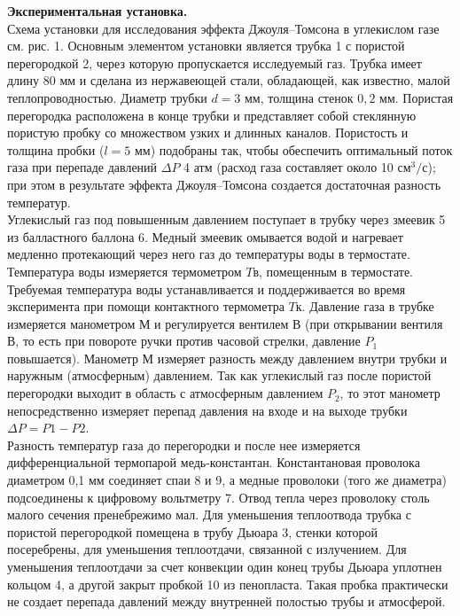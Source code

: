 \documentclass[a4paper, 12pt]{article}%
\begin{document}
	
	
	\textbf{Экспериментальная установка.}\\
	
	
	Схема установки для исследования эффекта Джоуля–Томсона в углекислом газе см. рис. 1. Основным элементом установки является трубка 1 с пористой перегородкой 2, через которую пропускается исследуемый газ. Трубка имеет длину 80 мм и сделана из нержавеющей стали, обладающей, как известно, малой теплопроводностью. Диаметр трубки $d = 3$ мм, толщина стенок $0,2$ мм. Пористая перегородка расположена в конце трубки и представляет собой стеклянную пористую пробку со множеством узких и длинных каналов. Пористость и толщина пробки ($l = 5$ мм) подобраны так, чтобы обеспечить оптимальный поток газа при перепаде давлений $\Delta P  $ 4 атм (расход газа составляет около 10 $см^3/с$); при этом в результате эффекта Джоуля–Томсона создается достаточная разность температур.\\
	
	Углекислый газ под повышенным давлением поступает в трубку через змеевик 5 из балластного баллона 6. Медный змеевик омывается водой и нагревает медленно протекающий через него газ до температуры воды в термостате. Температура воды измеряется термометром $T$в, помещенным в термостате. Требуемая температура воды устанавливается и поддерживается во время эксперимента при помощи контактного термометра $T$к.
	Давление газа в трубке измеряется манометром М и регулируется вентилем В (при открывании вентиля В, то есть  при повороте ручки против часовой стрелки, давление $P_1$ повышается). Манометр М измеряет разность между давлением внутри трубки и наружным (атмосферным) давлением. Так как углекислый газ после пористой перегородки выходит в область с атмосферным давлением $P_2$, то этот манометр непосредственно измеряет перепад давления на входе и на выходе трубки $\Delta P = P1 - P2.$\\
	Разность температур газа до перегородки и после нее измеряется дифференциальной термопарой медь-константан. Константановая проволока диаметром 0,1 мм соединяет спаи 8 и 9, а медные проволоки (того же диаметра) подсоединены к цифровому вольтметру 7. Отвод тепла через проволоку столь малого сечения пренебрежимо мал. Для уменьшения теплоотвода трубка с пористой перегородкой помещена в трубу Дьюара 3, стенки которой посеребрены, для уменьшения теплоотдачи, связанной с излучением. Для уменьшения теплоотдачи за счет конвекции один конец трубы Дьюара уплотнен кольцом 4, а другой закрыт пробкой 10 из пенопласта. Такая пробка практически не создает перепада давлений между внутренней полостью трубы и атмосферой.\\
	
\end{document}
